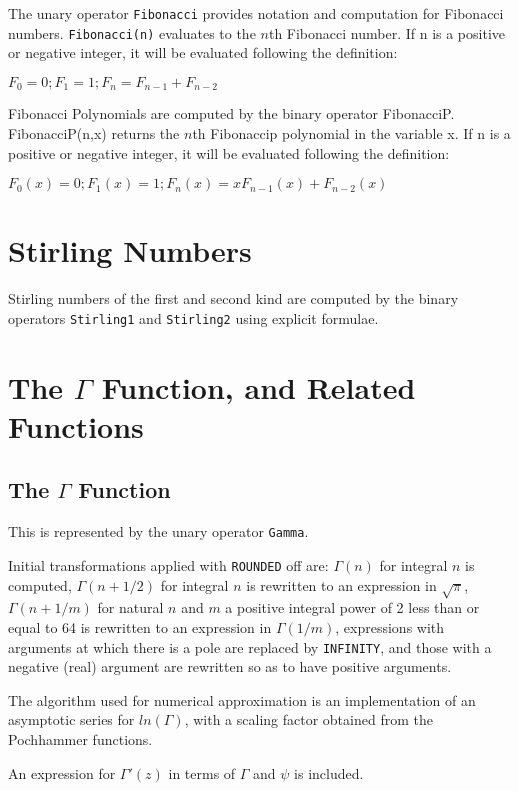 \documentclass[11pt]{article}
\begin{document}
The unary operator {\tt Fibonacci} provides notation and computation for
Fibonacci numbers.  {\tt Fibonacci(n)} evaluates to the $n$th Fibonacci
number. If n is a positive or negative integer, it will be evaluated following
the definition:

$F_0 = 0 ; F_1 = 1 ; F_n = F_{n-1} + F_{n-2} $

Fibonacci Polynomials are computed by the binary operator 
FibonacciP. FibonacciP(n,x) returns the $n$th Fibonaccip polynomial
in the variable x. If n is a positive or negative integer, it will be evaluated following
the definition:

$F_0(x) = 0 ; F_1(x) = 1 ; F_n(x) = x F_{n-1}(x) + F_{n-2}(x) $


\section{Stirling Numbers}
Stirling numbers of the first and second kind are computed 
by the binary operators {\tt Stirling1} and {\tt Stirling2}
using explicit formulae.


\section{The $\Gamma$ Function, and Related Functions}

\subsection{The $\Gamma$ Function}

This is represented by the unary operator {\tt Gamma}.

Initial transformations applied with {\tt ROUNDED} off are: $\Gamma(n)$ for
integral $n$ is computed, $\Gamma(n+1/2)$ for integral $n$ is rewritten to
an expression in $\sqrt\pi$, $\Gamma(n+1/m)$ for natural $n$ and $m$ a
positive integral power of 2 less than or equal to 64 is rewritten to an
expression in $\Gamma(1/m)$, expressions with arguments at which there is a
pole are replaced by {\tt INFINITY}, and those with a negative (real)
argument are rewritten so as to have positive arguments.

The algorithm used for numerical approximation is an implementation of an
asymptotic series for $ln(\Gamma)$, with a scaling factor obtained from
the Pochhammer functions.

An expression for $\Gamma'(z)$ in terms of $\Gamma$ and $\psi$ is
included.
\end{document}

